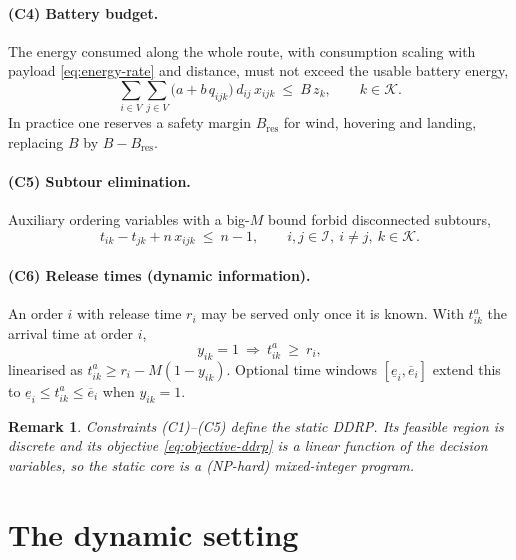 \documentclass[11pt,a4paper]{article}
\newtheorem{remark}{Remark}
\begin{document}
\paragraph{(C4) Battery budget.}
The energy consumed along the whole route, with consumption scaling with
payload \eqref{eq:energy-rate} and distance, must not exceed the usable battery
energy,
\begin{equation}
  \sum_{i\in V}\sum_{j\in V} \bigl(a + b\,q_{ijk}\bigr)\, d_{ij}\, x_{ijk}
  \ \le \ B\, z_{k},
  \qquad k\in\mathcal{K}.
  \label{eq:ddrp-battery}
\end{equation}
In practice one reserves a safety margin $B_{\text{res}}$ for wind, hovering and
landing, replacing $B$ by $B-B_{\text{res}}$.

\paragraph{(C5) Subtour elimination.}
Auxiliary ordering variables with a big-$M$ bound forbid disconnected subtours,
\begin{equation}
  t_{ik} - t_{jk} + n\,x_{ijk} \ \le \ n-1,
  \qquad i,j\in\mathcal{I},\ i\neq j,\ k\in\mathcal{K}.
  \label{eq:ddrp-mtz}
\end{equation}

\paragraph{(C6) Release times (dynamic information).}
An order $i$ with release time $r_{i}$ may be served only once it is known. With
$t^{a}_{ik}$ the arrival time at order $i$,
\begin{equation}
  y_{ik} = 1 \ \Rightarrow \ t^{a}_{ik} \ \ge \ r_{i},
  \label{eq:ddrp-release}
\end{equation}
linearised as $t^{a}_{ik} \ge r_{i} - M(1-y_{ik})$. Optional time windows
$[\underline{e}_{i},\overline{e}_{i}]$ extend this to
$\underline{e}_{i}\le t^{a}_{ik}\le \overline{e}_{i}$ when $y_{ik}=1$.

\begin{remark}
Constraints (C1)--(C5) define the static DDRP. Its feasible region is discrete
and its objective \eqref{eq:objective-ddrp} is a linear function of the decision
variables, so the static core is a (NP-hard) mixed-integer program.
\end{remark}

\section{The dynamic setting}
\end{document}
